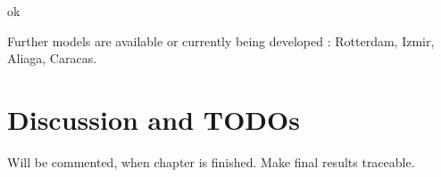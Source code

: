  \clearpage

 \clearpage

 \clearpage

 \clearpage

 ok

 \clearpage

 \clearpage

 \clearpage

 \clearpage

Further models are available or currently being developed \citep[][]{Axhausen_unpub_Hong_Kong_2013, MATSIM-T-Scenarios_Webpage_2014}: Rotterdam, Izmir, Aliaga, Caracas.


\section{Discussion and TODOs}
Will be commented, when chapter is finished. Make final results traceable.

